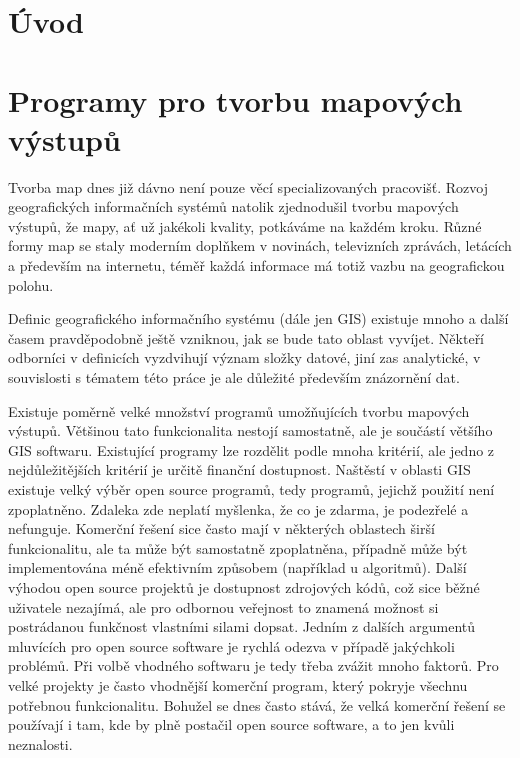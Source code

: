 \documentclass[a4paper,12pt,draft]{article}
\author{Anna Kratochvílová}
\begin{document}
\tableofcontents
\renewcommand{\refname}{Použité zdroje}

\section{Úvod}

\section{Programy pro tvorbu mapových výstupů}

Tvorba map dnes již dávno není pouze věcí specializovaných pracovišť. Rozvoj geografických informačních systémů natolik zjednodušil tvorbu mapových výstupů, že mapy, ať už jakékoli kvality, potkáváme na každém kroku. Různé formy map se staly moderním doplňkem v novinách, televizních zprávách, letácích a především na internetu, téměř každá informace má totiž vazbu na geografickou polohu.

Definic geografického informačního systému (dále jen GIS) existuje mnoho a další časem pravděpodobně ještě vzniknou, jak se bude tato oblast vyvíjet. Někteří odborníci v definicích vyzdvihují význam složky datové, jiní zas analytické, v souvislosti s tématem této práce je ale důležité především znázornění dat.

Existuje poměrně velké množství programů umožňujících tvorbu mapových výstupů. Většinou tato funkcionalita nestojí samostatně, ale je součástí většího GIS softwaru. Existující programy lze rozdělit podle mnoha kritérií, ale jedno z nejdůležitějších kritérií je určitě finanční dostupnost. Naštěstí v oblasti GIS existuje velký výběr open source programů, tedy programů, jejichž použití není zpoplatněno. Zdaleka zde neplatí myšlenka, že co je zdarma, je podezřelé a nefunguje. Komerční řešení sice často mají v některých oblastech širší funkcionalitu, ale ta může být samostatně zpoplatněna, případně může být implementována méně efektivním způsobem (například u algoritmů). Další výhodou open source projektů je dostupnost zdrojových kódů, což sice běžné uživatele nezajímá, ale pro odbornou veřejnost to znamená možnost si postrádanou funkčnost vlastními silami dopsat. Jedním z dalších argumentů mluvících pro open source software je rychlá odezva v případě jakýchkoli problémů. Při volbě vhodného softwaru je tedy třeba zvážit mnoho faktorů. Pro velké projekty je často vhodnější komerční program, který pokryje všechnu potřebnou funkcionalitu. Bohužel se dnes často stává, že velká komerční řešení se používají i tam, kde by plně postačil open source software, a to jen kvůli neznalosti.
\end{document}
